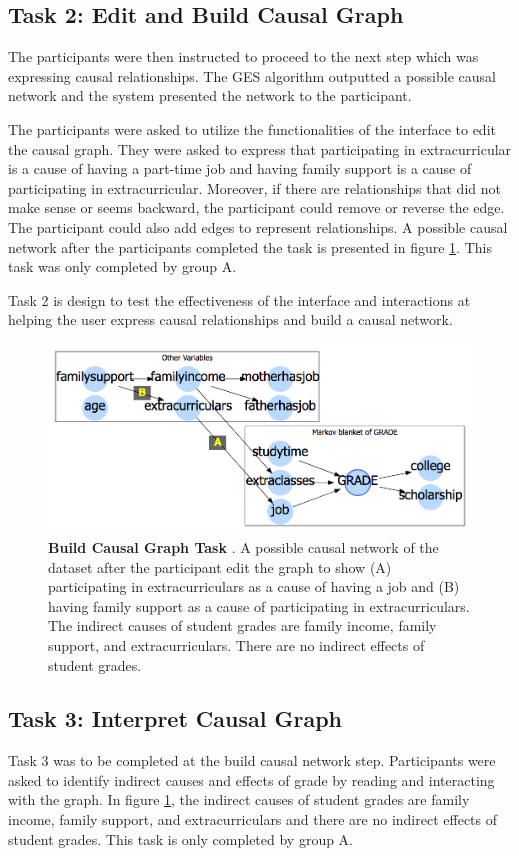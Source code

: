 \subsection { Task 2: Edit and Build Causal Graph }
The participants were then instructed to proceed to the next step which was expressing causal relationships. The GES algorithm outputted a possible causal network and the system presented the network to the participant. 

The participants were asked to utilize the functionalities of the interface to edit the causal graph. They were asked to express that participating in extracurricular is a cause of having a part-time job and having family support is a cause of participating in extracurricular. Moreover, if there are relationships that did not make sense or seems backward, the participant could remove or reverse the edge. The participant could also add edges to represent relationships. A possible causal network after the participants completed the task is presented in figure \ref{fig:Task2}. This task was only completed by group A. 

Task 2 is design to test the effectiveness of the interface and interactions at helping the user express causal relationships and build a causal network. 

\begin{figure}
    \centering
    \includegraphics[width=.85\textwidth]{task2-2}
    \caption{\textbf{ Build Causal Graph Task }. A possible causal network of the dataset after the participant edit the graph to show (A) participating in extracurriculars as a cause of having a job and (B) having family support as a cause of participating in extracurriculars. The indirect causes of student grades are family income, family support, and extracurriculars. There are no indirect effects of student grades.}
    \label{fig:Task2}
\end{figure}

\subsection { Task 3: Interpret Causal Graph }
Task 3 was to be completed at the build causal network step. Participants were asked to identify indirect causes and effects of grade by reading and interacting with the graph. In figure \ref{fig:Task2}, the indirect causes of student grades are family income, family support, and extracurriculars and there are no indirect effects of student grades. This task is only completed by group A. 


